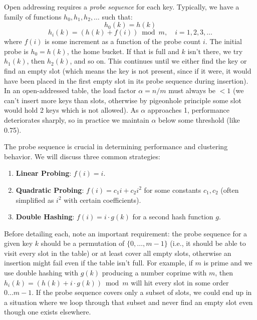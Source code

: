 \documentclass[11pt]{article}
\begin{document}
Open addressing requires a \emph{probe sequence} for each key. Typically, we have a family of functions $h_0, h_1, h_2,\ldots$ such that:
\[ h_0(k) = h(k) \]
\[ h_i(k) = (h(k) + f(i)) \bmod m, \quad i = 1,2,3,\ldots \]
where $f(i)$ is some increment as a function of the probe count $i$. The initial probe is $h_0 = h(k)$, the home bucket. If that is full and $k$ isn’t there, we try $h_1(k)$, then $h_2(k)$, and so on. This continues until we either find the key or find an empty slot (which means the key is not present, since if it were, it would have been placed in the first empty slot in its probe sequence during insertion). In an open-addressed table, the load factor $\alpha = n/m$ must always be $< 1$ (we can’t insert more keys than slots, otherwise by pigeonhole principle some slot would hold 2 keys which is not allowed). As $\alpha$ approaches 1, performance deteriorates sharply, so in practice we maintain $\alpha$ below some threshold (like 0.75).

The probe sequence is crucial in determining performance and clustering behavior. We will discuss three common strategies:
\begin{enumerate}
    \item \textbf{Linear Probing}: $f(i) = i$.
    \item \textbf{Quadratic Probing}: $f(i) = c_1 i + c_2 i^2$ for some constants $c_1, c_2$ (often simplified as $i^2$ with certain coefficients).
    \item \textbf{Double Hashing}: $f(i) = i \cdot g(k)$ for a second hash function $g$.
\end{enumerate}

Before detailing each, note an important requirement: the probe sequence for a given key $k$ should be a permutation of $\{0,\ldots,m-1\}$ (i.e., it should be able to visit every slot in the table) or at least cover all empty slots, otherwise an insertion might fail even if the table isn’t full. For example, if $m$ is prime and we use double hashing with $g(k)$ producing a number coprime with $m$, then $h_i(k) = (h(k) + i\cdot g(k)) \bmod m$ will hit every slot in some order $0 \ldots m-1$. If the probe sequence covers only a subset of slots, we could end up in a situation where we loop through that subset and never find an empty slot even though one exists elsewhere.
\end{document}
